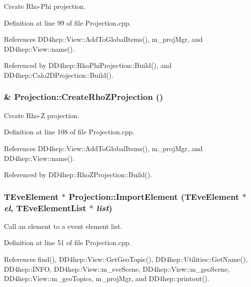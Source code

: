 Create Rho-\/Phi projection. 

Definition at line 99 of file Projection.cpp.

References DD4hep::View::AddToGlobalItems(), m\_\-projMgr, and DD4hep::View::name().

Referenced by DD4hep::RhoPhiProjection::Build(), and DD4hep::Calo2DProjection::Build().\hypertarget{class_d_d4hep_1_1_projection_ade3fca7391ef9616f9b9235d4e07a423}{
\subsubsection[{CreateRhoZProjection}]{ \& Projection::CreateRhoZProjection ()}}
\label{class_d_d4hep_1_1_projection_ade3fca7391ef9616f9b9235d4e07a423}


Create Rho-\/Z projection. 

Definition at line 108 of file Projection.cpp.

References DD4hep::View::AddToGlobalItems(), m\_\-projMgr, and DD4hep::View::name().

Referenced by DD4hep::RhoZProjection::Build().\hypertarget{class_d_d4hep_1_1_projection_ad68a569fdc412f5ed8769e89df3dd821}{
\subsubsection[{ImportElement}]{\setlength{\rightskip}{0pt plus 5cm}TEveElement $\ast$ Projection::ImportElement (TEveElement $\ast$ {\em el}, \/  {\bf TEveElementList} $\ast$ {\em list})}}
\label{class_d_d4hep_1_1_projection_ad68a569fdc412f5ed8769e89df3dd821}


Call an element to a event element list. 

Definition at line 51 of file Projection.cpp.

References find(), DD4hep::View::GetGeoTopic(), DD4hep::Utilities::GetName(), DD4hep::INFO, DD4hep::View::m\_\-eveScene, DD4hep::View::m\_\-geoScene, DD4hep::View::m\_\-geoTopics, m\_\-projMgr, and DD4hep::printout().

